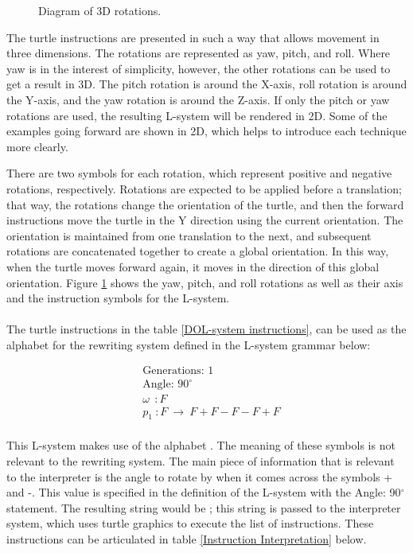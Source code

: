 \begin{figure}[htbp]
	{\centering
		\setlength{\fboxrule}{1pt}
		\vspace{7px}
		\caption{Diagram of 3D rotations.} \label{3D turtle rotations}
	}
\end{figure}
\FloatBarrier

\noindent
The turtle instructions are presented in such a way that allows movement in three dimensions. The rotations are represented as yaw, pitch, and roll. Where yaw is in the interest of simplicity, however, the other rotations can be used to get a result in 3D. The pitch rotation is around the X-axis, roll rotation is around the Y-axis, and the yaw rotation is around the Z-axis. If only the pitch or yaw rotations are used, the resulting L-system will be rendered in 2D. Some of the examples going forward are shown in 2D, which helps to introduce each technique more clearly. 

There are two symbols for each rotation, which represent positive and negative rotations, respectively. Rotations are expected to be applied before a translation; that way, the rotations change the orientation of the turtle, and then the forward instructions move the turtle in the Y direction using the current orientation. The orientation is maintained from one translation to the next, and subsequent rotations are concatenated together to create a global orientation. In this way, when the turtle moves forward again, it moves in the direction of this global orientation. Figure \ref{3D turtle rotations} shows the yaw, pitch, and roll rotations as well as their axis and the instruction symbols for the L-system.\\
\\
The turtle instructions in the table \ref{DOL-system instructions}, can be used as the alphabet for the rewriting system defined in the L-system grammar below:

\begin{equation} \label{DOL-system example}
\begin{aligned}
	&\text{Generations: 1}\\
	&\text{Angle: 90$^{\circ}$}\\
	&\omega~~ : F \\
	&p_1~ :  F~ \rightarrow~ F+F-F-F+F\\
\end{aligned}
\end{equation}

\noindent
This L-system makes use of the alphabet . The meaning of these symbols is not relevant to the rewriting system. The main piece of information that is relevant to the interpreter is the angle to rotate by when it comes across the symbols + and -. This value is specified in the definition of the L-system with the Angle: 90$^{\circ}$ statement. The resulting string would be ; this string is passed to the interpreter system, which uses turtle graphics to execute the list of instructions. These instructions can be articulated in table \ref{Instruction Interpretation} below.

